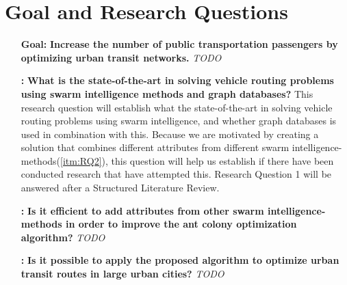 \section{Goal and Research Questions}

\begin{itemize}
\item[\textbf{Goal:}] \label{itm:goal} \textbf{Increase the number of public transportation passengers by optimizing urban transit networks.}
\newline
\emph{\color{blue} TODO}
\end{itemize}

\begin{itemize}

    \item[\textbf{\namedlabel{itm:RQ1}{RQ 1}:}] \textbf{What is the state-of-the-art in solving vehicle routing problems using swarm intelligence methods and graph databases?}
    \newline
    This research question will establish what the state-of-the-art in solving vehicle routing problems using swarm intelligence, and whether graph databases is used in combination with this. Because we are motivated by creating a solution that combines different attributes from different swarm intelligence-methods(\ref{itm:RQ2}), this question will help us establish if there have been conducted research that have attempted this. 
    Research Question 1 will be answered after a Structured Literature Review\citep{kofod2014}. %

    \item[\textbf{\namedlabel{itm:RQ2}{RQ 2}:}]\label{itm:RQ2} \textbf{Is it efficient to add attributes from other swarm intelligence-methods in order to improve the ant colony optimization algorithm?}
    \newline
    \emph{\color{blue} TODO}

    \item[\textbf{\namedlabel{itm:RQ3}{RQ 3}:}]\label{itm:RQ3}\textbf{Is it possible to apply the proposed algorithm to optimize urban transit routes in large urban cities?}
    \newline
    \emph{\color{blue} TODO}
\end{itemize}



